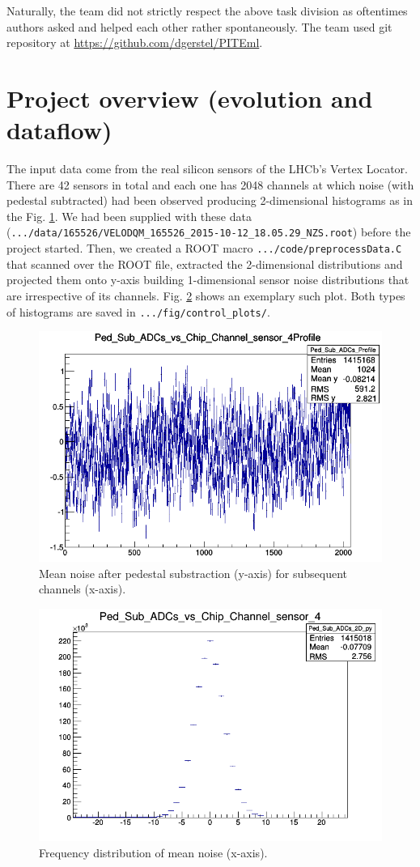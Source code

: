 \documentclass[a4paper,10pt]{article}
\begin{document}
Naturally, the team did not strictly respect the above task division as oftentimes authors asked and helped each other rather spontaneously.
The team used git repository at \url{https://github.com/dgerstel/PITEml}.

\section{Project overview (evolution and dataflow)}

The input data come from the real silicon sensors of the LHCb's Vertex Locator. There are 42 sensors in total and each one has 2048 channels at which noise (with pedestal subtracted) had been observed producing 2-dimensional histograms as in the Fig. \ref{f:2D}. We had been supplied with these data
\newline (\texttt{.../data/165526/VELODQM\_165526\_2015-10-12\_18.05.29\_NZS.root}) before the project started. Then, we created a ROOT macro \texttt{.../code/preprocessData.C} 
that scanned over the ROOT file, extracted the 2-dimensional distributions and projected them onto y-axis building 1-dimensional sensor noise distributions that are irrespective of its channels. Fig. \ref{f:1D} shows an exemplary such plot.
Both types of histograms are saved in \texttt{.../fig/control\_plots/}.


\begin{figure}[H]
    \centering
    \includegraphics[width=.7\textwidth]{../fig/control_plots/sample_ADC_vs_chann}
    \caption{Mean noise after pedestal substraction (y-axis) for subsequent channels (x-axis).}
    \label{f:2D}
\end{figure}

\begin{figure}[H]
    \centering
    \includegraphics[width=.7\textwidth]{../fig/control_plots/sample_ADC_distr}
    \caption{Frequency distribution of mean noise (x-axis).}
    \label{f:1D}
\end{figure}
\end{document}
